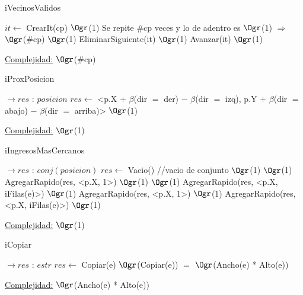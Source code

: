 \begin{Representacion}
\begin{Algoritmos}
	\begin{algorithm}[H]
		\caption{iVecinosValidos}
		\begin{algorithmic}[1]
				\State $it \gets$ CrearIt(cp) \Comment $\Ogr$(1)
				 \Comment Se repite $\#$cp veces y lo de adentro es $\Ogr$(1) $\Rightarrow$ $\Ogr$($\#$cp)
					 \Comment $\Ogr$(1)
						\State EliminarSiguiente(it) \Comment $\Ogr$(1)
					\Else
						\State Avanzar(it) \Comment $\Ogr$(1)
					\EndIf
				\EndWhile
			\EndProcedure		
		\end{algorithmic}
		\underline{Complejidad:} $\Ogr$($\#$cp)
	\end{algorithm}
				
	\begin{algorithm}[H]
		\caption{iProxPosicion}
		\begin{algorithmic}[1]
			 $\to res$ : $posicion$
				\State $res \gets$ <p.X $+$ $\beta$(dir $=$ der) $-$ $\beta$(dir $= $ izq), p.Y $+$ $\beta$(dir $=$ abajo) $-$ $\beta$(dir $=$ arriba)> \Comment $\Ogr$(1)
			\EndProcedure		
		\end{algorithmic}
		\underline{Complejidad:} $\Ogr$(1)
	\end{algorithm}
				
	\begin{algorithm}[H]
		\caption{iIngresosMasCercanos}
		\begin{algorithmic}[1]
			 $\to res$ : $conj(posicion)$
				\State $res \gets$ Vacio() //vacio de conjunto \Comment $\Ogr$(1)
				 \Comment $\Ogr$(1)
					\State AgregarRapido(res, <p.X, 1>) \Comment $\Ogr$(1)
				\Else
					 \Comment $\Ogr$(1)
						\State AgregarRapido(res, <p.X, iFilas(e)>) \Comment $\Ogr$(1)
					\Else
						\State AgregarRapido(res, <p.X, 1>) \Comment $\Ogr$(1)
						\State AgregarRapido(res, <p.X, iFilas(e)>) \Comment $\Ogr$(1)
					\EndIf				
				\EndIf
			\EndProcedure		
		\end{algorithmic}
		\underline{Complejidad:} $\Ogr$(1)
	\end{algorithm}
	
	\begin{algorithm}[H]
		\caption{iCopiar}
		\begin{algorithmic}[1]
			 $\to res$ : $estr$
				\State $res \gets$ Copiar(e) \Comment $\Ogr$(Copiar(e)) $=$ $\Ogr$(Ancho(e) * Alto(e))
			\EndProcedure
		\end{algorithmic}
		\underline{Complejidad:} $\Ogr$(Ancho(e) * Alto(e))
	\end{algorithm}	
	
\end{Algoritmos}
	    
    
\end{Representacion}